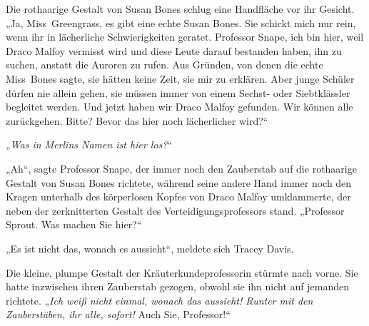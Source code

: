 Die rothaarige Gestalt von Susan Bones schlug eine Handfläche vor ihr Gesicht.
„Ja, Miss~Greengrass, es gibt eine echte Susan Bones. Sie schickt mich nur rein, wenn ihr in lächerliche Schwierigkeiten geratet. Professor Snape, ich bin hier, weil Draco Malfoy vermisst wird und diese Leute darauf bestanden haben, ihn zu suchen, anstatt die Auroren zu rufen. Aus Gründen, von denen die echte Miss~Bones sagte, sie hätten keine Zeit, sie mir zu erklären. Aber junge Schüler dürfen nie allein gehen, sie müssen immer von einem Sechst- oder Siebtklässler begleitet werden. Und jetzt haben wir Draco Malfoy gefunden. Wir können alle zurückgehen. Bitte? Bevor das hier noch lächerlicher wird?“

„\emph{Was in Merlins Namen ist hier los?}“

„Ah“, sagte Professor Snape, der immer noch den Zauberstab auf die rothaarige Gestalt von Susan Bones richtete, während seine andere Hand immer noch den Kragen unterhalb des körperlosen Kopfes von Draco Malfoy umklammerte, der neben der zerknitterten Gestalt des Verteidigungsprofessors stand.
„Professor Sprout. Was machen Sie hier?“

„Es ist nicht das, wonach es aussieht“, meldete sich Tracey Davis.

Die kleine, plumpe Gestalt der Kräuterkundeprofessorin stürmte nach vorne. Sie hatte inzwischen ihren Zauberstab gezogen, obwohl sie ihn nicht auf jemanden richtete.
„\emph{Ich weiß nicht einmal, wonach das aussieht! \emph{Runter mit den Zauberstäben}, ihr alle, sofort!} Auch Sie, Professor!“

